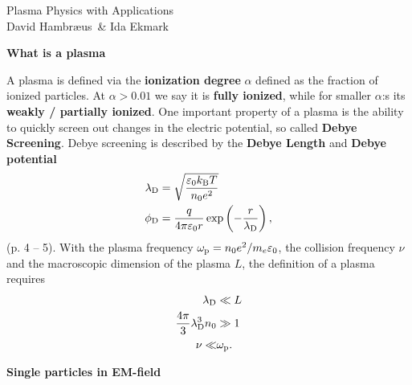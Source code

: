 \documentclass[10pt,landscape]{article}
\newcommand{\topiccolor}{green}
\renewcommand{\section}[2]{%
	\renewcommand{\topiccolor}{#2}
	\begin{tcolorbox}[boxsep=0.5mm, left=1mm, right=1mm, top=0mm, bottom=0mm,
		colback=#2!30, colframe=#2, arc is angular]%
		\centering \textbf{#1}%
	\end{tcolorbox}%
	\nopagebreak%
}
\newcommand{\cbf}[1]{\textcolor{\topiccolor!80!black}{\textbf{#1}}}
\begin{document}
\begin{multicols*}{3}
\begin{tcolorbox}[colframe=black, colback=white]
\centering \large Plasma Physics with Applications\\
\small David Hambr\ae{}us \& Ida Ekmark
\end{tcolorbox}

\section{What is a plasma}{gray}
A plasma is defined via the \cbf{ionization degree} $\alpha$ defined as the
fraction of ionized particles. At $\alpha > 0.01$ we say it is 
\cbf{fully ionized}, while for smaller $\alpha$:s its 
\cbf{weakly / partially ionized}.
One important property of a plasma is the ability to quickly screen out changes
in the electric potential, so called \cbf{Debye Screening}.
Debye screening is described by the \cbf{Debye Length} and \cbf{Debye potential}
\begin{align*}
	\lambda_{\rm D} &= \sqrt{\frac{\varepsilon_0 k_{\rm B} T}{n_0e^2}}\\
	\phi_{\rm D} &= \frac{q}{4\pi\varepsilon_0 r}\exp\left(-\frac{r}{\lambda_{\rm D}}\right),
\end{align*}
(p. 4 -- 5).
With the plasma frequency $\omega_{\rm p}=n_0e^2/m_e\varepsilon_0$, the collision frequency $\nu$ and the macroscopic dimension of the plasma $L$, the definition of a plasma requires
\begin{align*}
	\lambda_{\rm D} &\ll L\\
	\frac{4\pi}{3}\lambda_{\rm D}^3n_0 &\gg 1\\
	\nu \ll &\omega_{\rm p}.
\end{align*}

\section{Single particles in EM-field}{orange}


\end{multicols*}
\end{document}
